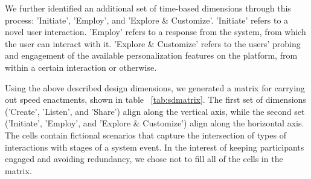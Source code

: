 We further identified an additional set of time-based dimensions through this process: 'Initiate', 'Employ', and 'Explore \& Customize'. 'Initiate' refers to a novel user interaction. 'Employ' refers to a response from the system, from which the user can interact with it. 'Explore \& Customize' refers to the users' probing and engagement of the available personalization features on the platform, from within a certain interaction or otherwise.

Using the above described design dimensions, we generated a matrix for carrying out speed enactments, shown in table ~\ref{tab:sdmatrix}. The first set of dimensions ('Create', 'Listen', and 'Share') align along the vertical axis, while the second set ('Initiate', 'Employ', and 'Explore \& Customize') align along the horizontal axis. The cells contain fictional scenarios that capture the intersection of types of interactions with stages of a system event. In the interest of keeping participants engaged and avoiding redundancy, we chose not to fill all of the cells in the matrix. 


